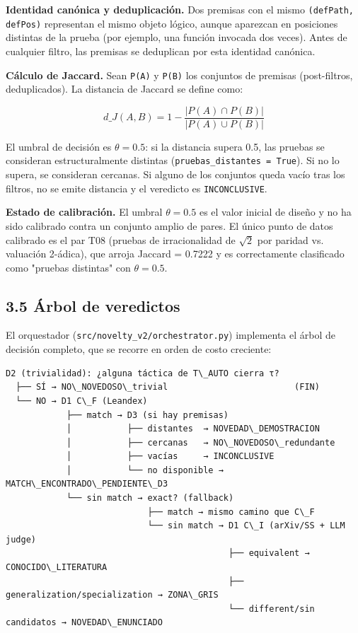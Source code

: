 \documentclass[12pt,a4paper]{article}
\theoremstyle{remark}
\begin{document}
\textbf{Identidad canónica y deduplicación.} Dos premisas con el mismo \texttt{(defPath, defPos)} representan el mismo objeto lógico, aunque aparezcan en posiciones distintas de la prueba (por ejemplo, una función invocada dos veces). Antes de cualquier filtro, las premisas se deduplican por esta identidad canónica.


\textbf{Cálculo de Jaccard.} Sean \texttt{P(A)} y \texttt{P(B)} los conjuntos de premisas (post-filtros, deduplicados). La distancia de Jaccard se define como:

$$d\_J(A, B) = 1 - \frac{|P(A) \cap P(B)|}{|P(A) \cup P(B)|}$$

El umbral de decisión es $\theta = 0.5$: si la distancia supera 0.5, las pruebas se consideran estructuralmente distintas (\texttt{pruebas\_distantes = True}). Si no lo supera, se consideran cercanas. Si alguno de los conjuntos queda vacío tras los filtros, no se emite distancia y el veredicto es \texttt{INCONCLUSIVE}.


\textbf{Estado de calibración.} El umbral $\theta = 0.5$ es el valor inicial de diseño y no ha sido calibrado contra un conjunto amplio de pares. El único punto de datos calibrado es el par T08 (pruebas de irracionalidad de $\sqrt{2}$ por paridad vs. valuación 2-ádica), que arroja Jaccard = 0.7222 y es correctamente clasificado como "pruebas distintas" con $\theta = 0.5$.


\subsection{3.5 Árbol de veredictos}

El orquestador (\texttt{src/novelty\_v2/orchestrator.py}) implementa el árbol de decisión completo, que se recorre en orden de costo creciente:


\begin{verbatim}D2 (trivialidad): ¿alguna táctica de T\_AUTO cierra τ?
  ├── SÍ → NO\_NOVEDOSO\_trivial                         (FIN)
  └── NO → D1 C\_F (Leandex)
            ├── match → D3 (si hay premisas)
            │           ├── distantes  → NOVEDAD\_DEMOSTRACION
            │           ├── cercanas   → NO\_NOVEDOSO\_redundante
            │           ├── vacías     → INCONCLUSIVE
            │           └── no disponible → MATCH\_ENCONTRADO\_PENDIENTE\_D3
            └── sin match → exact? (fallback)
                            ├── match → mismo camino que C\_F
                            └── sin match → D1 C\_I (arXiv/SS + LLM judge)
                                            ├── equivalent → CONOCIDO\_LITERATURA
                                            ├── generalization/specialization → ZONA\_GRIS
                                            └── different/sin candidatos → NOVEDAD\_ENUNCIADO\end{verbatim}
\end{document}
